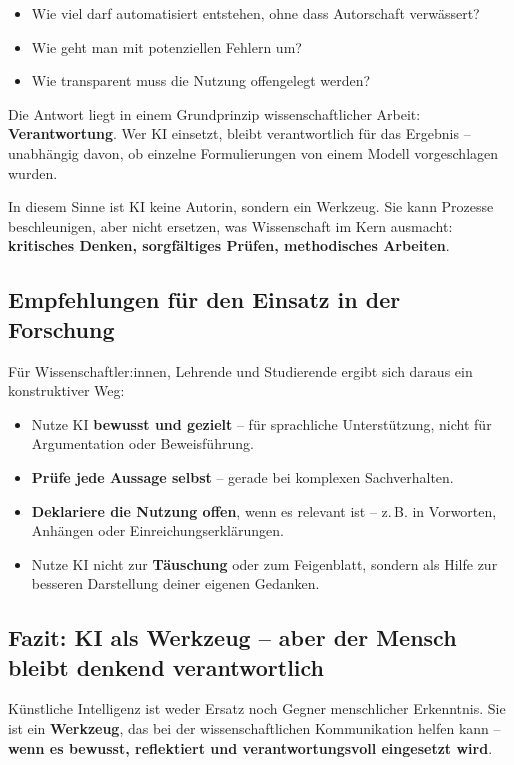 \begin{itemize}
	\item Wie viel darf automatisiert entstehen, ohne dass Autorschaft verwässert?
	\item Wie geht man mit potenziellen Fehlern um?
	\item Wie transparent muss die Nutzung offengelegt werden?
\end{itemize}

Die Antwort liegt in einem Grundprinzip wissenschaftlicher Arbeit: \textbf{Verantwortung}. Wer KI einsetzt, bleibt verantwortlich für das Ergebnis – unabhängig davon, ob einzelne Formulierungen von einem Modell vorgeschlagen wurden.

In diesem Sinne ist KI keine Autorin, sondern ein Werkzeug. Sie kann Prozesse beschleunigen, aber nicht ersetzen, was Wissenschaft im Kern ausmacht: \textbf{kritisches Denken, sorgfältiges Prüfen, methodisches Arbeiten}.

\subsection*{Empfehlungen für den Einsatz in der Forschung}
Für Wissenschaftler:innen, Lehrende und Studierende ergibt sich daraus ein konstruktiver Weg:

\begin{itemize}
	\item Nutze KI \textbf{bewusst und gezielt} – für sprachliche Unterstützung, nicht für Argumentation oder Beweisführung.
	\item \textbf{Prüfe jede Aussage selbst} – gerade bei komplexen Sachverhalten.
	\item \textbf{Deklariere die Nutzung offen}, wenn es relevant ist – z.\,B. in Vorworten, Anhängen oder Einreichungserklärungen.
	\item Nutze KI nicht zur \textbf{Täuschung} oder zum Feigenblatt, sondern als Hilfe zur besseren Darstellung deiner eigenen Gedanken.
\end{itemize}

\subsection*{Fazit: KI als Werkzeug – aber der Mensch bleibt denkend verantwortlich}
Künstliche Intelligenz ist weder Ersatz noch Gegner menschlicher Erkenntnis. Sie ist ein \textbf{Werkzeug}, das bei der wissenschaftlichen Kommunikation helfen kann – \textbf{wenn es bewusst, reflektiert und verantwortungsvoll eingesetzt wird}.

